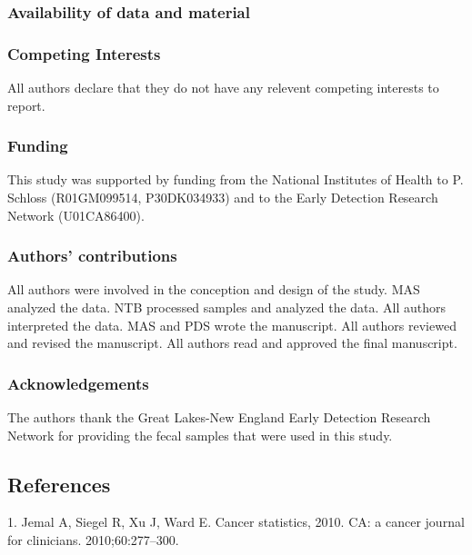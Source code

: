 \documentclass[12pt,]{article}
\begin{document}
\subsubsection{Availability of data and
material}\label{availability-of-data-and-material}

\subsubsection{Competing Interests}\label{competing-interests}

All authors declare that they do not have any relevent competing
interests to report.

\subsubsection{Funding}\label{funding}

This study was supported by funding from the National Institutes of
Health to P. Schloss (R01GM099514, P30DK034933) and to the Early
Detection Research Network (U01CA86400).

\subsubsection{Authors' contributions}\label{authors-contributions}

All authors were involved in the conception and design of the study. MAS
analyzed the data. NTB processed samples and analyzed the data. All
authors interpreted the data. MAS and PDS wrote the manuscript. All
authors reviewed and revised the manuscript. All authors read and
approved the final manuscript.

\subsubsection{Acknowledgements}\label{acknowledgements}

The authors thank the Great Lakes-New England Early Detection Research
Network for providing the fecal samples that were used in this study.

\newpage

\subsection*{References}\label{references}

\hypertarget{refs}{}
\hypertarget{ref-jemal_cancer_2010}{}
1. Jemal A, Siegel R, Xu J, Ward E. Cancer statistics, 2010. CA: a
cancer journal for clinicians. 2010;60:277--300.
\end{document}
